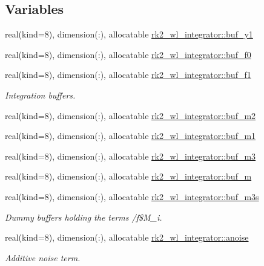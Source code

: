 \subsection*{Variables}
\begin{DoxyCompactItemize}
\item 
real(kind=8), dimension(\+:), allocatable \hyperlink{namespacerk2__wl__integrator_aa99c24f0aa8ae7eacd3d5123ea70db7b}{rk2\+\_\+wl\+\_\+integrator\+::buf\+\_\+y1}
\item 
real(kind=8), dimension(\+:), allocatable \hyperlink{namespacerk2__wl__integrator_a1bd3729b5251a62db77c2821d8570527}{rk2\+\_\+wl\+\_\+integrator\+::buf\+\_\+f0}
\item 
real(kind=8), dimension(\+:), allocatable \hyperlink{namespacerk2__wl__integrator_a995936e8fb15609c95896f08b5e70a44}{rk2\+\_\+wl\+\_\+integrator\+::buf\+\_\+f1}
\begin{DoxyCompactList}\small\item\em Integration buffers. \end{DoxyCompactList}\item 
real(kind=8), dimension(\+:), allocatable \hyperlink{namespacerk2__wl__integrator_a86ad58f3281d4e047c2db27060d98d2f}{rk2\+\_\+wl\+\_\+integrator\+::buf\+\_\+m2}
\item 
real(kind=8), dimension(\+:), allocatable \hyperlink{namespacerk2__wl__integrator_a4be840fb90a95206b2740f5a0b31b83f}{rk2\+\_\+wl\+\_\+integrator\+::buf\+\_\+m1}
\item 
real(kind=8), dimension(\+:), allocatable \hyperlink{namespacerk2__wl__integrator_a73553426581c0b8705341b6faf38cff1}{rk2\+\_\+wl\+\_\+integrator\+::buf\+\_\+m3}
\item 
real(kind=8), dimension(\+:), allocatable \hyperlink{namespacerk2__wl__integrator_a744d43e9a769cad7dde659df50975e35}{rk2\+\_\+wl\+\_\+integrator\+::buf\+\_\+m}
\item 
real(kind=8), dimension(\+:), allocatable \hyperlink{namespacerk2__wl__integrator_ac3e8a32ab8553b8c00d467a792bbf051}{rk2\+\_\+wl\+\_\+integrator\+::buf\+\_\+m3s}
\begin{DoxyCompactList}\small\item\em Dummy buffers holding the terms /f\$\+M\+\_\+i. \end{DoxyCompactList}\item 
real(kind=8), dimension(\+:), allocatable \hyperlink{namespacerk2__wl__integrator_ab0045343086f8e55d6dd0579105aad6d}{rk2\+\_\+wl\+\_\+integrator\+::anoise}
\begin{DoxyCompactList}\small\item\em Additive noise term. \end{DoxyCompactList}\item 

\end{DoxyCompactItemize}
